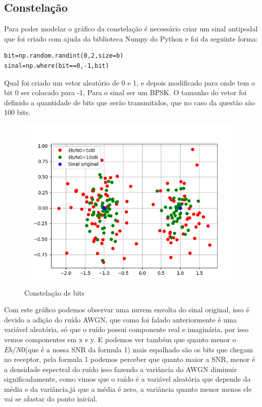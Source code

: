 \documentclass[12pt]{article}
\begin{document}
\subsection{Constelação}
Para poder modelar o gráfico da constelação é necessário criar um sinal antipodal que foi criado com ajuda da biblioteca Numpy do Python e foi da seguinte forma:
\begin{lstlisting}
bit=np.random.randint(0,2,size=b)
sinal=np.where(bit==0,-1,bit)
\end{lstlisting}
Qual foi criado um vetor aleatório de 0 e 1, e depois modificado para onde tem o bit 0 ser colocado para -1, Para o sinal ser um BPSK. O tamanho do vetor foi definido a quantidade de bits que serão transmitidos, que no caso da questão são 100 bits.

\begin{figure}[h]
    \centering
    \includegraphics{constelacao.png}
    \caption{Constelação de bits}
    \label{fig:my_label}
\end{figure}
Com este gráfico podemos observar uma nuvem envolta do sinal original, isso é devido a adição do ruído AWGN, que como foi falado anteriormente é uma variável aleatória, só que o ruído possui componente real e imaginária, por isso vemos componentes em x e y.
E podemos ver também que quanto menor o $Eb/N0$(que é a nossa SNR da formula 1) mais espalhado são os bits que chegam no receptor, pela formula 1 podemos perceber que quanto maior a SNR, menor é a densidade espectral do ruído isso fazendo a variância do AWGN diminuir significadamente, como vimos que o ruído é a variável aleatória que depende da média e da variância,já que a média é zero, a variância quanto menor menos ele vai se afastar do ponto inicial.
\end{document}
